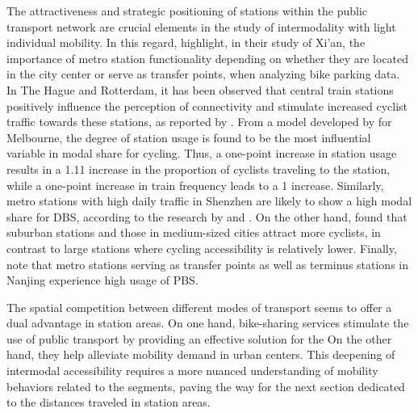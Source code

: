 \begin{refsegment}
The attractiveness and strategic positioning of stations within the public transport network are crucial elements in the study of intermodality with light individual mobility. In this regard, \textcolor{blue}{\textcite[1934]{chen_study_2013}} highlight, in their study of Xi'an, the importance of metro station functionality depending on whether they are located in the city center or serve as transfer points, when analyzing bike parking data. In The Hague and Rotterdam, it has been observed that central train stations positively influence the perception of connectivity and stimulate increased cyclist traffic towards these stations, as reported by \textcolor{blue}{\textcite[494]{la_paix_puello_role_2021}}. From a model developed by \textcolor{blue}{\textcite[401]{weliwitiya_bicycle_2019}} for Melbourne, the degree of station usage is found to be the most influential variable in modal share for cycling. Thus, a one-point increase in station usage results in a 1.11 increase in the proportion of cyclists traveling to the station, while a one-point increase in train frequency leads to a 1 increase. Similarly, metro stations with high daily traffic in Shenzhen are likely to show a high modal share for \acrshort{DBS}, according to the research by \textcolor{blue}{\textcite[12]{guo_built_2020}} and \textcolor{blue}{\textcite[388]{guo_role_2021}}. On the other hand, \textcolor{blue}{\textcite[397]{la_paix_puello_integration_2016}} found that suburban stations and those in medium-sized cities attract more cyclists, in contrast to large stations where cycling accessibility is relatively lower. Finally, \textcolor{blue}{\textcite[9]{cheng_promoting_2022}} note that metro stations serving as transfer points as well as terminus stations in Nanjing experience high usage of \acrshort{PBS}.%

The spatial competition between different modes of transport seems to offer a dual advantage in station areas. On one hand, bike-sharing services stimulate the use of public transport by providing an effective solution for the  On the other hand, they help alleviate mobility demand in urban centers. This deepening of intermodal accessibility requires a more nuanced understanding of mobility behaviors related to the  segments, paving the way for the next section dedicated to the distances traveled in station areas.%


\end{refsegment}
